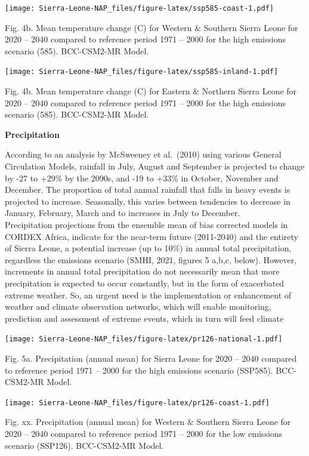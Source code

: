 \documentclass[
]{book}
\begin{document}
\texttt{[image: Sierra-Leone-NAP\_files/figure-latex/ssp585-coast-1.pdf]}

Fig. 4b. Mean temperature change (C) for Western \& Southern Sierra Leone for 2020 -- 2040 compared to reference period 1971 -- 2000 for the high emissions scenario (585). BCC-CSM2-MR Model.

\texttt{[image: Sierra-Leone-NAP\_files/figure-latex/ssp585-inland-1.pdf]}

Fig. 4b. Mean temperature change (C) for Eastern \& Northern Sierra Leone for 2020 -- 2040 compared to reference period 1971 -- 2000 for the high emissions scenario (585). BCC-CSM2-MR Model.

\textbf{Precipitation}

According to an analysis by McSweeney et al.~(2010) using various General Circulation Models, rainfall in July, August and September is projected to change by -27 to +29\% by the 2090s, and -19 to +33\% in October, November and December. The proportion of total annual rainfall that falls in heavy events is projected to increase. Seasonally, this varies between tendencies to decrease in January, February, March and to increases in July to December.\\
Precipitation projections from the ensemble mean of bias corrected models in CORDEX Africa, indicate for the near-term future (2011-2040) and the entirety of Sierra Leone, a potential increase (up to 10\%) in annual total precipitation, regardless the emissions scenario (SMHI, 2021, figures 5 a,b,c, below). However, increments in annual total precipitation do not necessarily mean that more precipitation is expected to occur constantly, but in the form of exacerbated extreme weather. So, an urgent need is the implementation or enhancement of weather and climate observation networks, which will enable monitoring, prediction and assessment of extreme events, which in turn will feed climate

\texttt{[image: Sierra-Leone-NAP\_files/figure-latex/pr126-national-1.pdf]}

Fig. 5a. Precipitation (annual mean) for Sierra Leone for 2020 -- 2040 compared to reference period 1971 -- 2000 for the high emissions scenario (SSP585). BCC-CSM2-MR Model.

\texttt{[image: Sierra-Leone-NAP\_files/figure-latex/pr126-coast-1.pdf]}

Fig. xx. Precipitation (annual mean) for Western \& Southern Sierra Leone for 2020 -- 2040 compared to reference period 1971 -- 2000 for the low emissions scenario (SSP126). BCC-CSM2-MR Model.
\end{document}
